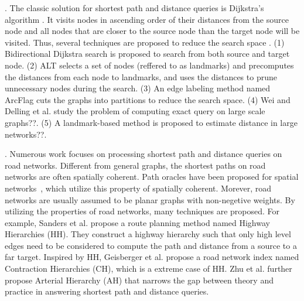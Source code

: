.
The classic solution for shortest path and distance queries is Dijkstra's algorithm \cite{Dijkstra59}. It visits nodes in ascending order of their distances from the source node and all nodes that are closer to the source node than the target node will be visited. Thus, several techniques are proposed to reduce the search space \cite{LubyR89, GoldbergH05}. (1) Bidirectional Dijkstra search \cite{LubyR89} is proposed to search from both source and target node. (2) ALT \cite{GoldbergH05} selects a set of nodes (reffered to as landmarks) and precomputes the distances from each node to landmarks, and uses the distances to prune unnecessary nodes during the search. (3) An edge labeling method named ArcFlag \cite{MohringSSWW05} cuts the graphs into partitions to reduce the search space.
(4) Wei \cite{Wei10} and Delling et al.\cite{delling2014robust} study the problem of computing exact query on large scale graphs??.
(5) A landmark-based method \cite{PotamiasBCG09} is proposed to estimate distance in large networks??.




.
Numerous work focuses on processing shortest path and distance queries on road networks. Different from general graphs, the shortest paths on road networks are often spatially coherent. Path oracles have been proposed for spatial networks~\cite{SankaranarayananSA09}, which utilize this property of spatially coherent. Morever, road networks are usually assumed to be planar graphs with non-negetive weights\cite{fakcharoenphol2006planar,gupta2004roads,klein2010shortest,MozesS12}. By utilizing the properties of road networks, many techniques\cite{SandersS05, GeisbergerSSD08, zhu2013shortest} are proposed. For example, Sanders et al. propose a route planning method named Highway Hierarchies (HH)\cite{SandersS05}. They construct a highway hierarchy such that only high level edges need to be considered to compute the path and distance from a source to a far target. Inspired by HH, Geisberger et al.\cite{GeisbergerSSD08} propose a road network index named Contraction Hierarchies (CH), which is a extreme case of HH. Zhu et al. further propose Arterial Hierarchy (AH)\cite{zhu2013shortest} that narrows the gap between theory and practice in answering shortest path and distance queries.

